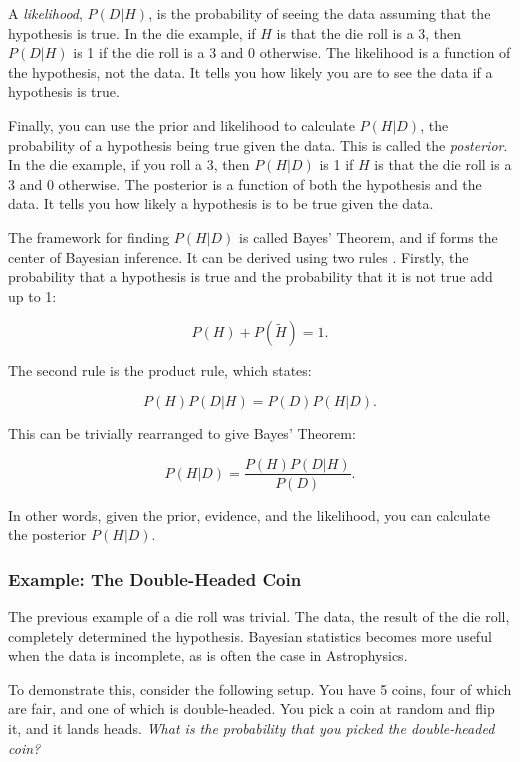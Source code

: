 \documentclass[preprint2,longauthor]{aastex631}
\begin{document}
A \textit{likelihood}, $P(D|H)$, is the probability of seeing the data assuming that the hypothesis is true. In the die example, if $H$ is that the die roll is a 3, then $P(D|H)$ is 1 if the die roll is a 3 and 0 otherwise. The likelihood is a function of the hypothesis, not the data. It tells you how likely you are to see the data if a hypothesis is true.

Finally, you can use the prior and likelihood to calculate $P(H|D)$, the probability of a hypothesis being true given the data. This is called the \textit{posterior}. In the die example, if you roll a 3, then $P(H|D)$ is 1 if $H$ is that the die roll is a 3 and 0 otherwise. The posterior is a function of both the hypothesis and the data. It tells you how likely a hypothesis is to be true given the data.

The framework for finding $P(H|D)$ is called Bayes' Theorem, and if forms the center of Bayesian inference. It can be derived using two rules \citep{coxProbabilityFrequencyReasonable1946}. Firstly, the probability that a hypothesis is true and the probability that it is not true add up to 1:

\begin{equation}
  P(H) + P(\tilde{H}) = 1.
\end{equation}

The second rule is the product rule, which states:

\begin{equation}
  P(H)P(D|H) = P(D)P(H|D).
\end{equation}

This can be trivially rearranged to give Bayes' Theorem:

\begin{equation}
  P(H|D) = \frac{P(H)P(D|H)}{P(D)}.
\end{equation}

In other words, given the prior, evidence, and the likelihood, you can calculate the posterior $P(H|D)$.

\subsubsection{Example: The Double-Headed Coin}
The previous example of a die roll was trivial. The data, the result of the die roll, completely determined the hypothesis. Bayesian statistics becomes more useful when the data is incomplete, as is often the case in Astrophysics.

To demonstrate this, consider the following setup. You have 5 coins, four of which are fair, and one of which is double-headed. You pick a coin at random and flip it, and it lands heads. \textit{What is the probability that you picked the double-headed coin?}
\end{document}
